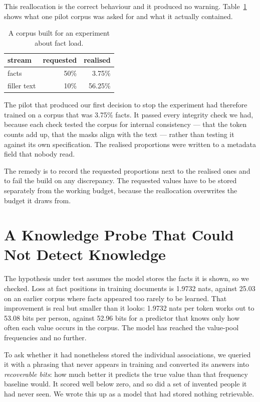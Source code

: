 \documentclass[10pt,twocolumn]{article}
\begin{document}
This reallocation is the correct behaviour and it produced no warning.
Table~\ref{tab:mix} shows what one pilot corpus was asked for and what it
actually contained.

\begin{table}[h]
\centering\small
\begin{tabular}{lrr}
\toprule
stream & requested & realised \\
\midrule
facts & 50\% & 3.75\% \\
filler text & 10\% & 56.25\% \\
\bottomrule
\end{tabular}
\caption{A corpus built for an experiment about fact load.}
\label{tab:mix}
\end{table}

The pilot that produced our first decision to stop the experiment had therefore
trained on a corpus that was 3.75\% facts. It passed every integrity check we
had, because each check tested the corpus for internal consistency --- that the
token counts add up, that the masks align with the text --- rather than testing
it against its own specification. The realised proportions were written to a
metadata field that nobody read.

The remedy is to record the requested proportions next to the realised ones and
to fail the build on any discrepancy. The requested values have to be stored
separately from the working budget, because the reallocation overwrites the
budget it draws from.

\section{A Knowledge Probe That Could Not Detect Knowledge}
\label{sec:store}

The hypothesis under test assumes the model stores the facts it is shown, so we
checked. Loss at fact positions in training documents is 1.9732 nats, against
25.03 on an earlier corpus where facts appeared too rarely to be learned. That
improvement is real but smaller than it looks: 1.9732 nats per token works out
to 53.08 bits per person, against 52.96 bits for a predictor that knows only
how often each value occurs in the corpus. The model has reached the value-pool
frequencies and no further.

To ask whether it had nonetheless stored the individual associations, we
queried it with a phrasing that never appears in training and converted its
answers into \emph{recoverable bits}: how much better it predicts the true
value than that frequency baseline would. It scored well below zero, and so did
a set of invented people it had never seen. We wrote this up as a model that
had stored nothing retrievable.
\end{document}

